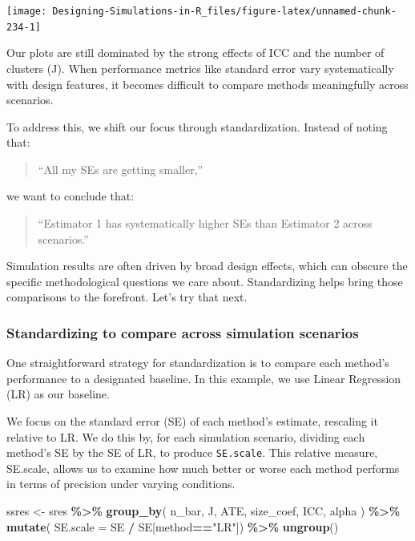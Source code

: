 \documentclass[
]{book}
\newenvironment{Shaded}{\begin{snugshade}}{\end{snugshade}}
\newcommand{\AttributeTok}[1]{\textcolor[rgb]{0.13,0.29,0.53}{#1}}
\newcommand{\FunctionTok}[1]{\textcolor[rgb]{0.13,0.29,0.53}{\textbf{#1}}}
\newcommand{\NormalTok}[1]{#1}
\newcommand{\OtherTok}[1]{\textcolor[rgb]{0.56,0.35,0.01}{#1}}
\newcommand{\SpecialCharTok}[1]{\textcolor[rgb]{0.81,0.36,0.00}{\textbf{#1}}}
\newcommand{\StringTok}[1]{\textcolor[rgb]{0.31,0.60,0.02}{#1}}
\begin{document}
\begin{center}\texttt{[image: Designing-Simulations-in-R\_files/figure-latex/unnamed-chunk-234-1]} \end{center}

Our plots are still dominated by the strong effects of ICC and the number of clusters (J). When performance metrics like standard error vary systematically with design features, it becomes difficult to compare methods meaningfully across scenarios.

To address this, we shift our focus through standardization. Instead of noting that:

\begin{quote}
``All my SEs are getting smaller,''
\end{quote}

we want to conclude that:

\begin{quote}
``Estimator 1 has systematically higher SEs than Estimator 2 across scenarios.''
\end{quote}

Simulation results are often driven by broad design effects, which can obscure the specific methodological questions we care about. Standardizing helps bring those comparisons to the forefront.
Let's try that next.

\subsubsection{Standardizing to compare across simulation scenarios}\label{standardizing-to-compare-across-simulation-scenarios}

One straightforward strategy for standardization is to compare each method's performance to a designated baseline. In this example, we use Linear Regression (LR) as our baseline.

We focus on the standard error (SE) of each method's estimate, rescaling it relative to LR.
We do this by, for each simulation scenario, dividing each method's SE by the SE of LR, to produce \texttt{SE.scale}.
This relative measure, SE.scale, allows us to examine how much better or worse each method performs in terms of precision under varying conditions.

\begin{Shaded}
\begin{Highlighting}[]
\NormalTok{ssres }\OtherTok{\textless{}{-}} 
\NormalTok{  sres }\SpecialCharTok{\%\textgreater{}\%} 
  \FunctionTok{group\_by}\NormalTok{( n\_bar, J, ATE, size\_coef, ICC, alpha ) }\SpecialCharTok{\%\textgreater{}\%}
  \FunctionTok{mutate}\NormalTok{( }\AttributeTok{SE.scale =}\NormalTok{ SE }\SpecialCharTok{/}\NormalTok{ SE[method}\SpecialCharTok{==}\StringTok{"LR"}\NormalTok{]) }\SpecialCharTok{\%\textgreater{}\%}
  \FunctionTok{ungroup}\NormalTok{()}
\end{Highlighting}
\end{Shaded}
\end{document}
